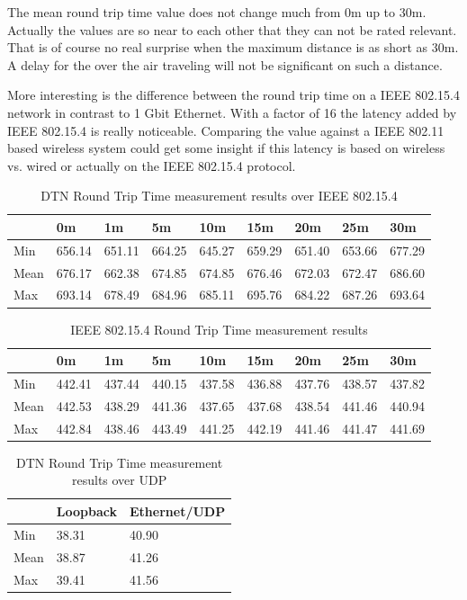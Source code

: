 The mean round trip time value does not change much from 0m up to 30m. Actually
the values are so near to each other that they can not be rated relevant. That
is of course no real surprise when the maximum distance is as short as 30m. A
delay for the over the air traveling will not be significant on such a distance.

More interesting is the difference between the round trip time on a IEEE
802.15.4 network in contrast to 1 Gbit Ethernet. With a factor of 16 the latency
added by IEEE 802.15.4 is really noticeable. Comparing the value against a
IEEE 802.11 based wireless system could get some insight if this latency is based
on wireless vs. wired or actually on the IEEE 802.15.4 protocol.

\begin{table}
\begin{tabular}{lllllllll}
    & 0m & 1m & 5m & 10m & 15m & 20m & 25m & 30m \\
\hline
Min & 656.14 & 651.11 & 664.25 & 645.27 & 659.29 & 651.40 & 653.66 & 677.29 \\
Mean & 676.17 & 662.38 & 674.85 & 674.85 & 676.46 & 672.03 & 672.47 & 686.60 \\
Max & 693.14 & 678.49 & 684.96 & 685.11 & 695.76 & 684.22 & 687.26 & 693.64 \\
\end{tabular}
\caption{DTN Round Trip Time measurement results over IEEE 802.15.4}
\label{dtnrtt}
\end{table}

\begin{table}
\begin{tabular}{lllllllll}
    & 0m & 1m & 5m & 10m & 15m & 20m & 25m & 30m \\
\hline
Min & 442.41 & 437.44 & 440.15 & 437.58 & 436.88 & 437.76 & 438.57 & 437.82 \\
Mean & 442.53 & 438.29 & 441.36 & 437.65 & 437.68 & 438.54 & 441.46 & 440.94 \\
Max & 442.84 & 438.46 & 443.49 & 441.25 & 442.19 & 441.46 & 441.47 & 441.69 \\
\end{tabular}
\caption{IEEE 802.15.4 Round Trip Time measurement results}
\label{802154rtt}
\end{table}

\begin{table}
\begin{tabular}{lll}
    & Loopback & Ethernet/UDP \\
\hline
Min & 38.31 & 40.90 \\
Mean & 38.87 & 41.26 \\
Max & 39.41 & 41.56 \\
\end{tabular}
\caption{DTN Round Trip Time measurement results over UDP}
\label{dtnrtt2}
\end{table}
